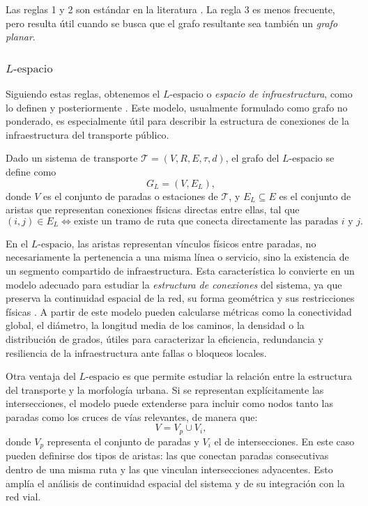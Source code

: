             Las reglas 1 y 2 son estándar en la literatura \cite{barraza2021, fielbaum2016, vanferber2009, dingluo2019}. La regla 3 es menos frecuente, pero resulta útil cuando se busca que el grafo resultante sea también un \textit{grafo planar}.

            \subsubsection{$L\text{-espacio}$}

                Siguiendo estas reglas, obtenemos el $L\text{-espacio}$ o \textit{espacio de infraestructura}, como lo definen \cite{vanferber2009} y posteriormente \cite{dingluo2019}. Este modelo, usualmente formulado como grafo no ponderado, es especialmente útil para describir la estructura de conexiones de la infraestructura del transporte público.

                \begin{definicion}[$L$-espacio]
                    Dado un sistema de transporte $\mathcal{T} = (V, R, E, \tau, d)$, el grafo del $L$-espacio se define como
                    $$
                        G_L = (V,E_L),
                    $$
                    donde $V$ es el conjunto de paradas o estaciones de $\mathcal{T}$, y $E_L \subseteq E$ es el conjunto de aristas que representan conexiones físicas directas entre ellas, tal que
                    $$
                        (i,j)\in E_L \iff \text{existe un tramo de ruta que conecta directamente las paradas } i \text{ y } j.
                    $$
                \end{definicion}

                En el $L\text{-espacio}$, las aristas representan vínculos físicos entre paradas, no necesariamente la pertenencia a una misma línea o servicio, sino la existencia de un segmento compartido de infraestructura. Esta característica lo convierte en un modelo adecuado para estudiar la \textit{estructura de conexiones} del sistema, ya que preserva la continuidad espacial de la red, su forma geométrica y sus restricciones físicas \cite{dingluo2019,vanferber2009}. A partir de este modelo pueden calcularse métricas como la conectividad global, el diámetro, la longitud media de los caminos, la densidad o la distribución de grados, útiles para caracterizar la eficiencia, redundancia y resiliencia de la infraestructura ante fallas o bloqueos locales.

                Otra ventaja del $L\text{-espacio}$ es que permite estudiar la relación entre la estructura del transporte y la morfología urbana. Si se representan explícitamente las intersecciones, el modelo puede extenderse para incluir como nodos tanto las paradas como los cruces de vías relevantes, de manera que:
                $$
                V = V_p \cup V_i,
                $$
                donde $V_p$ representa el conjunto de paradas y $V_i$ el de intersecciones. En este caso pueden definirse dos tipos de aristas: las que conectan paradas consecutivas dentro de una misma ruta y las que vinculan intersecciones adyacentes. Esto amplía el análisis de continuidad espacial del sistema y de su integración con la red vial.

